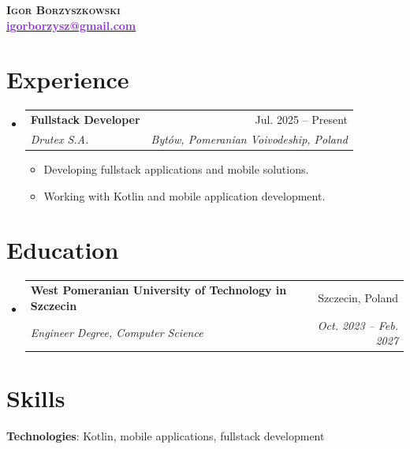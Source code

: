 \documentclass[letterpaper,11pt]{article}
\makeatletter
\newcommand{\resumeItem}[1]{
  \item\small{{#1 \vspace{-2pt}}}
}
\newcommand{\resumeSubheading}[4]{
  \vspace{-2pt}\item
    \begin{tabular*}{0.97\textwidth}[t]{l@{\extracolsep{\fill}}r}
      \textbf{#1} & #2 \\
      \textit{\small#3} & \textit{\small #4} \\
    \end{tabular*}\vspace{-7pt}
}
\newcommand{\resumeSubHeadingListStart}{\begin{itemize}[leftmargin=0.15in, label={}]}
\newcommand{\resumeSubHeadingListEnd}{\end{itemize}}
\newcommand{\resumeItemListStart}{\begin{itemize}}
\newcommand{\resumeItemListEnd}{\end{itemize}\vspace{-5pt}}
\makeatother
\begin{document}
\begin{center}
    \textbf{\LARGE \scshape Igor Borzyszkowski} \\ \vspace{2pt}
    \href{mailto:igorborzysz@gmail.com}{\textcolor{BlueViolet}{\faEnvelopeO\enspace \textbf{igorborzysz@gmail.com}}}
\end{center}

\section{Experience}
  \resumeSubHeadingListStart
    \resumeSubheading
      {Fullstack Developer}{Jul. 2025 -- Present}
      {Drutex S.A.}{Bytów, Pomeranian Voivodeship, Poland}
      \resumeItemListStart
        \resumeItem{Developing fullstack applications and mobile solutions.}
        \resumeItem{Working with Kotlin and mobile application development.}
      \resumeItemListEnd
  \resumeSubHeadingListEnd

\section{Education}
  \resumeSubHeadingListStart
    \resumeSubheading
      {West Pomeranian University of Technology in Szczecin}{Szczecin, Poland}
      {Engineer Degree, Computer Science}{Oct. 2023 -- Feb. 2027}
  \resumeSubHeadingListEnd

\section{Skills}
 \begin{itemize}[leftmargin=0.15in, label={}]
    \small{\item{
     \textbf{Technologies}{: Kotlin, mobile applications, fullstack development} \\
    }}
 \end{itemize}
\end{document}
